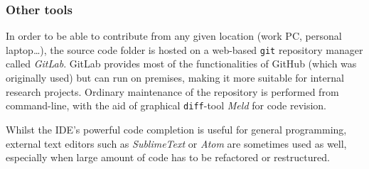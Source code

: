 \subsubsection{Other tools}
In order to be able to contribute from any given location (work PC, personal laptop\dots), the source code folder is hosted on a web-based \texttt{git} repository manager called \emph{GitLab}.
GitLab provides most of the functionalities of GitHub (which was originally used) but can run on premises, making it more suitable for internal research projects.
Ordinary maintenance of the repository is performed from command-line, with the aid of graphical \texttt{diff}-tool \emph{Meld} for code revision.

Whilst the IDE's powerful code completion is useful for general programming, external text editors such as \emph{SublimeText} or \emph{Atom} are sometimes used as well, especially when large amount of code has to be refactored or restructured.

